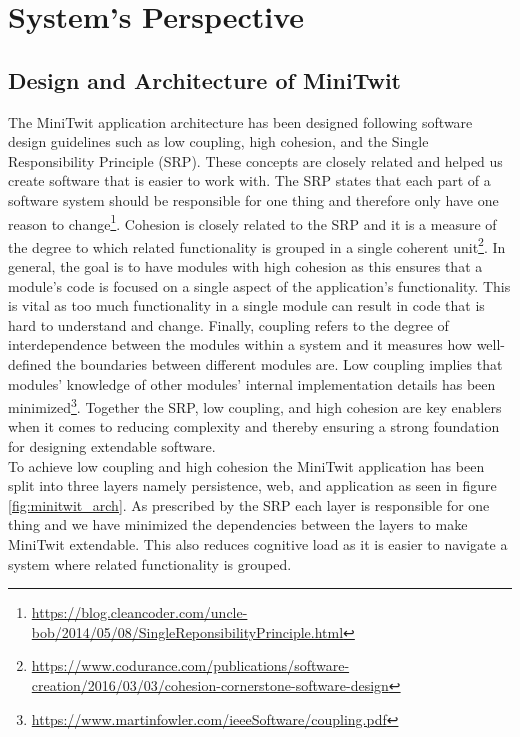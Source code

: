 \section{System's Perspective}

\subsection{Design and Architecture of MiniTwit}
The MiniTwit application architecture has been designed following software design guidelines such as low coupling, high cohesion, and the Single Responsibility Principle (SRP). 
These concepts are closely related and helped us create software that is easier to work with. The SRP states that each part of a software system should be responsible for one thing and therefore only have one reason to change\footnote{\url{https://blog.cleancoder.com/uncle-bob/2014/05/08/SingleReponsibilityPrinciple.html}}. 
Cohesion is closely related to the SRP and it is a measure of the degree to which related functionality is grouped in a single coherent unit\footnote{\url{https://www.codurance.com/publications/software-creation/2016/03/03/cohesion-cornerstone-software-design}}. 
In general, the goal is to have modules with high cohesion as this ensures that a module's code is focused on a single aspect of the application's functionality. 
This is vital as too much functionality in a single module can result in code that is hard to understand and change. 
Finally, coupling refers to the degree of interdependence between the modules within a system and it measures how well-defined the boundaries between different modules are. 
Low coupling implies that modules' knowledge of other modules' internal implementation details has been minimized\footnote{\url{https://www.martinfowler.com/ieeeSoftware/coupling.pdf}}. 
Together the SRP, low coupling, and high cohesion are key enablers when it comes to reducing complexity and thereby ensuring a strong foundation for designing extendable software. \\

To achieve low coupling and high cohesion the MiniTwit application has been split into three layers namely persistence, web, and application as seen in figure \ref{fig:minitwit_arch}. 
As prescribed by the SRP each layer is responsible for one thing and we have minimized the dependencies between the layers to make MiniTwit extendable.
 This also reduces cognitive load as it is easier to navigate a system where related functionality is grouped. 


